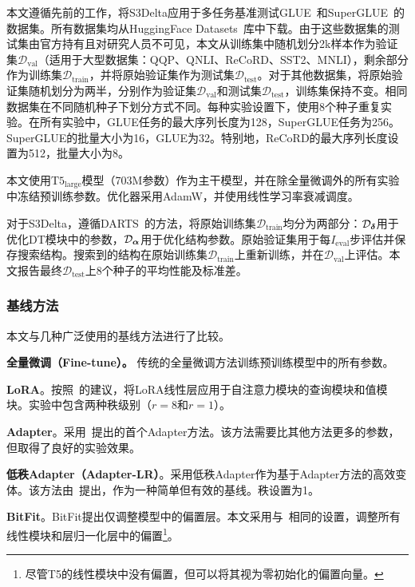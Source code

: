 \label{App:datasetsandptms}
本文遵循先前的工作，将S3Delta应用于多任务基准测试GLUE~\cite{wang2018glue}和SuperGLUE~\cite{NEURIPS2019_4496bf24}的数据集。所有数据集均从HuggingFace Datasets~\cite{lhoest2021datasets}库中下载。由于这些数据集的测试集由官方持有且对研究人员不可见，本文从训练集中随机划分2k样本作为验证集$\mathcal{D}_{\text{val}}$（适用于大型数据集：QQP、QNLI、ReCoRD、SST2、MNLI），剩余部分作为训练集$\mathcal{D}_{\text{train}}$，并将原始验证集作为测试集$\mathcal{D}_{\text{test}}$。对于其他数据集，将原始验证集随机划分为两半，分别作为验证集$\mathcal{D}_{\text{val}}$和测试集$\mathcal{D}_{\text{test}}$，训练集保持不变。相同数据集在不同随机种子下划分方式不同。每种实验设置下，使用8个种子重复实验。在所有实验中，GLUE任务的最大序列长度为128，SuperGLUE任务为256。SuperGLUE的批量大小为16，GLUE为32。特别地，ReCoRD的最大序列长度设置为512，批量大小为8。

本文使用$\text{T}5_{\text{large}}$模型（703M参数）作为主干模型，并在除全量微调外的所有实验中冻结预训练参数。优化器采用AdamW，并使用线性学习率衰减调度。

对于S3Delta，遵循DARTS~\cite{liu2018darts}的方法，将原始训练集$\mathcal{D}_{\text{train}}$均分为两部分：$\mathcal{D}_{\boldsymbol{\delta}}$用于优化DT模块中的参数，$\mathcal{D}_{\boldsymbol{\alpha}}$用于优化结构参数。原始验证集用于每$I_{\text{eval}}$步评估并保存搜索结构。搜索到的结构在原始训练集$\mathcal{D}_{\text{train}}$上重新训练，并在$\mathcal{D}_{\text{val}}$上评估。本文报告最终$\mathcal{D}_{\text{test}}$上8个种子的平均性能及标准差。
\subsubsection{基线方法}

本文与几种广泛使用的基线方法进行了比较。

\noindent\textbf{全量微调（Fine-tune）。} 传统的全量微调方法训练预训练模型中的所有参数。

\noindent\textbf{LoRA}。按照~\citet{hu2021lora}的建议，将LoRA线性层应用于自注意力模块的查询模块和值模块。实验中包含两种秩级别（$r=8$和$r=1$）。

\noindent\textbf{Adapter}。采用~\citet{houlsby2019parameter}提出的首个Adapter方法。该方法需要比其他方法更多的参数，但取得了良好的实验效果。

\noindent\textbf{低秩Adapter（Adapter-LR）}。采用低秩Adapter作为基于Adapter方法的高效变体。该方法由~\citet{mahabadi2021compacter}提出，作为一种简单但有效的基线。秩设置为1。

\noindent\textbf{BitFit}。BitFit提出仅调整模型中的偏置层。本文采用与~\citet{zaken2021bitfit}相同的设置，调整所有线性模块和层归一化层中的偏置\footnote{尽管T5的线性模块中没有偏置，但可以将其视为零初始化的偏置向量。}。

